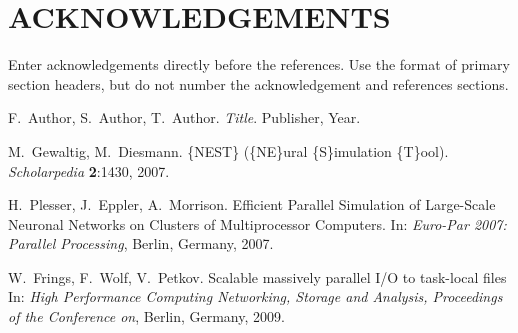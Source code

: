 \documentclass[]{YIC2015}
\begin{document}
\section*{ACKNOWLEDGEMENTS}
Enter acknowledgements directly before the references. Use the format of primary section headers, but do not number the acknowledgement and references sections.


\begin{thebibliography}{99}

F.~Author, S.~Author, T.~Author. \textit{Title}. Publisher, Year.

M.~Gewaltig, M.~Diesmann. \{NEST\} (\{NE\}ural \{S\}imulation \{T\}ool). \textit{Scholarpedia} %
\textbf{2}:1430, 2007.

H.~Plesser, J.~Eppler, A.~Morrison. Efficient Parallel Simulation of Large-Scale
                  Neuronal Networks on Clusters of Multiprocessor
                  Computers. In: \textit{Euro-Par 2007: Parallel Processing}, Berlin, Germany, 2007.
                  
W.~Frings, F.~Wolf, V.~Petkov. Scalable massively parallel I/O to task-local files
 In: \textit{High Performance Computing Networking, Storage and Analysis, Proceedings of the Conference on}, Berlin, Germany, 2009.


\end{thebibliography}

\end{document}
